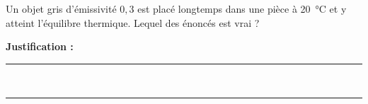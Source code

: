 Un objet gris d'émissivité $0{,}3$ est placé longtemps dans une pièce à \qty{20}{\degreeCelsius} et y atteint l'équilibre thermique. Lequel des énoncés est vrai ?

\choices

\noindent\textbf{Justification :} \hrulefill \\[2.5ex]
\rule{\linewidth}{0.4pt} \\[2.5ex]
\rule{\linewidth}{0.4pt}
\vfill
